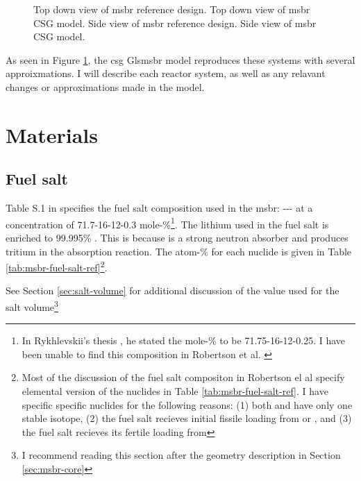 \begin{figure}[htpb]
{        \label{fig:msbr-model-xz}
    }
    \caption[Full views of MSBR]{
         Top down view of \Gls{msbr} reference design.
         Top down view of \Gls{msbr} CSG model.
         Side view of \Gls{msbr} reference design.
         Side view of \Gls{msbr} CSG model.
    }
    \label{fig:msbr-overview}
\end{figure}

As seen in Figure \ref{fig:msbr-overview}, the \Gls{csg} Gls{msbr}
model reproduces these systems with several approixmations. I will
describe each reactor system, as well as any relavant changes or
approximations made in the model.

\section{Materials}
\label{sec:msbr-materials}

\subsection{Fuel salt}
\label{sub:msbr-fuel-salt}
Table S.1 in \cite{robertson_conceptual_1971} specifies the fuel salt
composition used in the \Gls{msbr}:
--- at a
concentration of 71.7-16-12-0.3 mole-\%\footnote{In Rykhlevskii's thesis
\cite{rykhlevskii_fuel_2020}, he stated the mole-\% to be 71.75-16-12-0.25. I
have been unable to find this composition in Robertson et al.
\cite{robertson_conceptual_1971}}. The lithium used in the fuel salt is
enriched to 99.995\% . This is because  is a strong
neutron absorber and produces tritium in the absorption reaction. The atom-\%
for each nuclide is given in Table \ref{tab:msbr-fuel-salt-ref}\footnote{Most of the
discussion of the fuel salt compositon in Robertson el al
\cite{robertson_conceptual_1971} specify elemental version of the nuclides in
Table \ref{tab:msbr-fuel-salt-ref}. I have specific specific nuclides for the
following reasons: (1) both  and  have only one stable isotope, (2)
the fuel salt recieves initial fissile loading from  or
, and (3) the fuel salt recieves its fertile loading from
}.

See Section \ref{sec:salt-volume} for additional discussion of the value used
for the salt volume\footnote{I recommend reading this section after the geometry
description in Section \ref{sec:msbr-core}}

